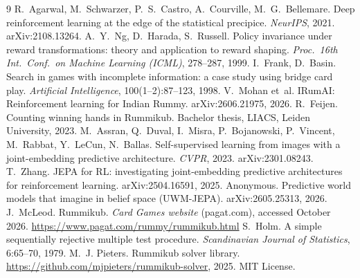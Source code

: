 \documentclass[11pt]{article}
\begin{document}
\begin{thebibliography}{9}
 R.~Agarwal, M.~Schwarzer, P.~S.~Castro, A.~Courville, M.~G.~Bellemare. Deep reinforcement learning at the edge of the statistical precipice. \emph{NeurIPS}, 2021. arXiv:2108.13264.
 A.~Y.~Ng, D.~Harada, S.~Russell. Policy invariance under reward transformations: theory and application to reward shaping. \emph{Proc.\ 16th Int.\ Conf.\ on Machine Learning (ICML)}, 278--287, 1999.
 I.~Frank, D.~Basin. Search in games with incomplete information: a case study using bridge card play. \emph{Artificial Intelligence}, 100(1--2):87--123, 1998.
 V.~Mohan et~al. IRumAI: Reinforcement learning for Indian Rummy. arXiv:2606.21975, 2026.
 R.~Feijen. Counting winning hands in Rummikub. Bachelor thesis, LIACS, Leiden University, 2023.
 M.~Assran, Q.~Duval, I.~Misra, P.~Bojanowski, P.~Vincent, M.~Rabbat, Y.~LeCun, N.~Ballas. Self-supervised learning from images with a joint-embedding predictive architecture. \emph{CVPR}, 2023. arXiv:2301.08243.
 T.~Zhang. JEPA for RL: investigating joint-embedding predictive architectures for reinforcement learning. arXiv:2504.16591, 2025.
 Anonymous. Predictive world models that imagine in belief space (UWM-JEPA). arXiv:2605.25313, 2026.
 J.~McLeod. Rummikub. \emph{Card Games website} (pagat.com), accessed October 2026. \url{https://www.pagat.com/rummy/rummikub.html}
 S.~Holm. A simple sequentially rejective multiple test procedure. \emph{Scandinavian Journal of Statistics}, 6:65--70, 1979.
 M.~J. Pieters. Rummikub solver library. \url{https://github.com/mjpieters/rummikub-solver}, 2025. MIT License.
\end{thebibliography}


\end{document}
